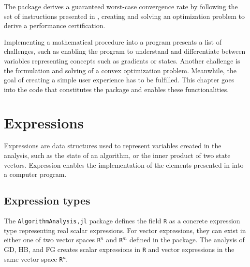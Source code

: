  
The package derives a guaranteed worst-case convergence rate by following the set of instructions presented in , creating and solving an optimization problem to derive a performance certification.

Implementing a mathematical procedure into a program presents a list of challenges, such as enabling the program to understand and differentiate between variables representing concepts such as gradients or states. Another challenge is the formulation and solving of a convex optimization problem. Meanwhile, the goal of creating a simple user experience has to be fulfilled. This chapter goes into the code that constitutes the package and enables these functionalities.
\section{Expressions}

Expressions are data structures used to represent variables created in the analysis, such as the state of an algorithm, or the inner product of two state vectors. Expression enables the implementation of the elements presented in  into a computer program.

\subsection*{Expression types}
The \texttt{AlgorithmAnalysis,jl} package defines the field \texttt{R} as a concrete expression type representing real scalar expressions. For vector expressions, they can exist in either one of two vector spaces \texttt{R$^n$} and \texttt{R$^m$} defined in the package. The analysis of GD, HB, and FG creates scalar expressions in \texttt{R} and vector expressions in the same vector space \texttt{R$^n$}.

